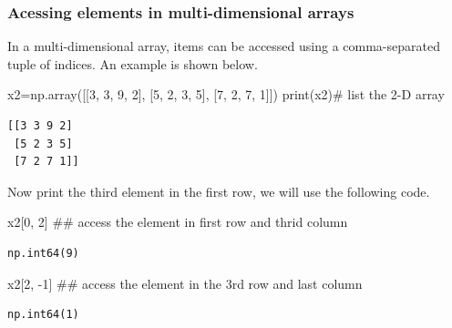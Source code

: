 \documentclass[
  letterpaper,
  DIV=11,
  numbers=noendperiod]{scrreprt}
\newenvironment{Shaded}{\begin{snugshade}}{\end{snugshade}}
\newcommand{\BuiltInTok}[1]{\textcolor[rgb]{0.00,0.23,0.31}{#1}}
\newcommand{\CommentTok}[1]{\textcolor[rgb]{0.37,0.37,0.37}{#1}}
\newcommand{\DecValTok}[1]{\textcolor[rgb]{0.68,0.00,0.00}{#1}}
\newcommand{\NormalTok}[1]{\textcolor[rgb]{0.00,0.23,0.31}{#1}}
\newcommand{\OperatorTok}[1]{\textcolor[rgb]{0.37,0.37,0.37}{#1}}
\theoremstyle{plain}
\theoremstyle{definition}
\theoremstyle{remark}
\begin{document}
\subsubsection{Acessing elements in multi-dimensional
arrays}\label{acessing-elements-in-multi-dimensional-arrays}

In a multi-dimensional array, items can be accessed using a
comma-separated tuple of indices. An example is shown below.

\begin{Shaded}
\begin{Highlighting}[]
\NormalTok{x2}\OperatorTok{=}\NormalTok{np.array([[}\DecValTok{3}\NormalTok{, }\DecValTok{3}\NormalTok{, }\DecValTok{9}\NormalTok{, }\DecValTok{2}\NormalTok{],}
\NormalTok{       [}\DecValTok{5}\NormalTok{, }\DecValTok{2}\NormalTok{, }\DecValTok{3}\NormalTok{, }\DecValTok{5}\NormalTok{],}
\NormalTok{       [}\DecValTok{7}\NormalTok{, }\DecValTok{2}\NormalTok{, }\DecValTok{7}\NormalTok{, }\DecValTok{1}\NormalTok{]])}
\BuiltInTok{print}\NormalTok{(x2)}\CommentTok{\# list the 2{-}D array}
\end{Highlighting}
\end{Shaded}

\begin{verbatim}
[[3 3 9 2]
 [5 2 3 5]
 [7 2 7 1]]
\end{verbatim}

Now print the third element in the first row, we will use the following
code.

\begin{Shaded}
\begin{Highlighting}[]
\NormalTok{x2[}\DecValTok{0}\NormalTok{, }\DecValTok{2}\NormalTok{] }\CommentTok{\#\# access the element in first row and thrid column}
\end{Highlighting}
\end{Shaded}

\begin{verbatim}
np.int64(9)
\end{verbatim}

\begin{Shaded}
\begin{Highlighting}[]
\NormalTok{x2[}\DecValTok{2}\NormalTok{, }\OperatorTok{{-}}\DecValTok{1}\NormalTok{] }\CommentTok{\#\# access the element in the 3rd row and last column}
\end{Highlighting}
\end{Shaded}

\begin{verbatim}
np.int64(1)
\end{verbatim}
\end{document}
